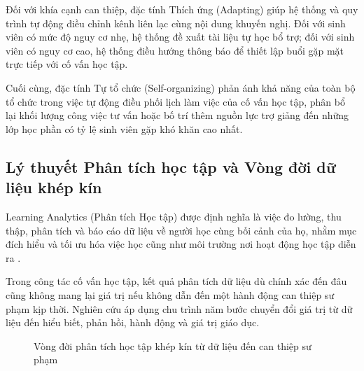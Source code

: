 Đối với khía cạnh can thiệp, đặc tính Thích ứng (Adapting) giúp hệ thống và quy trình tự động điều chỉnh kênh liên lạc cùng nội dung khuyến nghị. Đối với sinh viên có mức độ nguy cơ nhẹ, hệ thống đề xuất tài liệu tự học bổ trợ; đối với sinh viên có nguy cơ cao, hệ thống điều hướng thông báo để thiết lập buổi gặp mặt trực tiếp với cố vấn học tập. 

Cuối cùng, đặc tính Tự tổ chức (Self-organizing) phản ánh khả năng của toàn bộ tổ chức trong việc tự động điều phối lịch làm việc của cố vấn học tập, phân bổ lại khối lượng công việc tư vấn hoặc bố trí thêm nguồn lực trợ giảng đến những lớp học phần có tỷ lệ sinh viên gặp khó khăn cao nhất.

\subsection{Lý thuyết Phân tích học tập và Vòng đời dữ liệu khép kín}
Learning Analytics (Phân tích Học tập) được định nghĩa là việc đo lường, thu thập, phân tích và báo cáo dữ liệu về người học cùng bối cảnh của họ, nhằm mục đích hiểu và tối ưu hóa việc học cũng như môi trường nơi hoạt động học tập diễn ra \citep{long2011, lang2017}.

Trong công tác cố vấn học tập, kết quả phân tích dữ liệu dù chính xác đến đâu cũng không mang lại giá trị nếu không dẫn đến một hành động can thiệp sư phạm kịp thời. Nghiên cứu áp dụng chu trình năm bước chuyển đổi giá trị từ dữ liệu đến hiểu biết, phản hồi, hành động và giá trị giáo dục.

\begin{figure}[htbp]
\centering
{}
\caption{Vòng đời phân tích học tập khép kín từ dữ liệu đến can thiệp sư phạm}
\label{fig:la_loop}
\end{figure}

